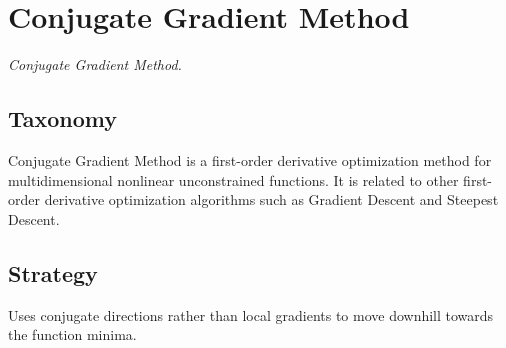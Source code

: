 
\section{Conjugate Gradient Method} 
\label{sec:conjugate_gradient}

\emph{Conjugate Gradient Method.}

\subsection{Taxonomy}
Conjugate Gradient Method is a first-order derivative optimization method for multidimensional nonlinear unconstrained functions.
It is related to other first-order derivative optimization algorithms such as Gradient Descent and Steepest Descent.


\subsection{Strategy}

Uses conjugate directions rather than local gradients to move downhill towards the function minima. 


